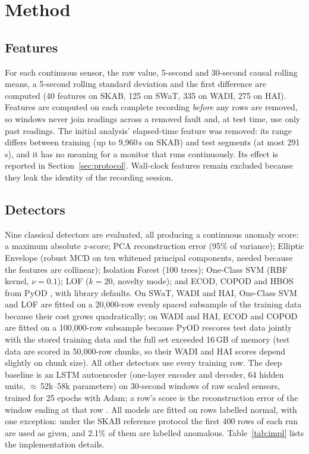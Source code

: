 \documentclass[11pt]{article}
\begin{document}
\section{Method}
\label{sec:method}

\subsection{Features}
For each continuous sensor, the raw value, 5-second and 30-second causal
rolling means, a 5-second rolling standard deviation and the first difference
are computed (40 features on SKAB, 125 on SWaT, 335 on WADI, 275 on HAI). Features are computed on each
complete recording \emph{before} any rows are removed, so windows never join
readings across a removed fault and, at test time, use only past readings.
The initial analysis' elapsed-time feature was removed: its range differs between
training (up to 9{,}960\,s on SKAB) and test segments (at most 291\,s), and it
has no meaning for a monitor that runs continuously. Its effect is reported
in Section~\ref{sec:protocol}. Wall-clock features remain excluded because they
leak the identity of the recording session.

\subsection{Detectors}
Nine classical detectors are evaluated, all producing a continuous anomaly score:
a maximum absolute $z$-score; PCA reconstruction error (95\% of variance);
Elliptic Envelope (robust MCD on ten whitened principal components, needed
because the features are collinear); Isolation Forest (100 trees); One-Class SVM
(RBF kernel, $\nu{=}0.1$); LOF ($k{=}20$, novelty mode); and ECOD, COPOD and
HBOS from PyOD \citep{zhao2019}, with library defaults. On SWaT, WADI and HAI,
One-Class SVM and LOF are fitted on a 20{,}000-row evenly spaced subsample of the training data
because their cost grows quadratically; on WADI and HAI, ECOD and COPOD are fitted on a
100{,}000-row subsample because PyOD rescores test data jointly with the stored
training data and the full set exceeded 16\,GB of memory (test data are scored in
50{,}000-row chunks, so their WADI and HAI scores depend slightly on chunk size). All other
detectors use every training row. The deep baseline is an LSTM autoencoder (one-layer encoder and decoder,
64 hidden units, $\approx$\,52k--58k parameters) on 30-second windows of raw
scaled sensors, trained for 25 epochs with Adam; a row's score is the
reconstruction error of the window ending at that row \citep{malhotra2016}.
All models are fitted on rows labelled normal, with one exception: under the
SKAB reference protocol the first 400 rows of each run are used as given, and
2.1\% of them are labelled anomalous. Table~\ref{tab:impl} lists the implementation
details.
\end{document}
